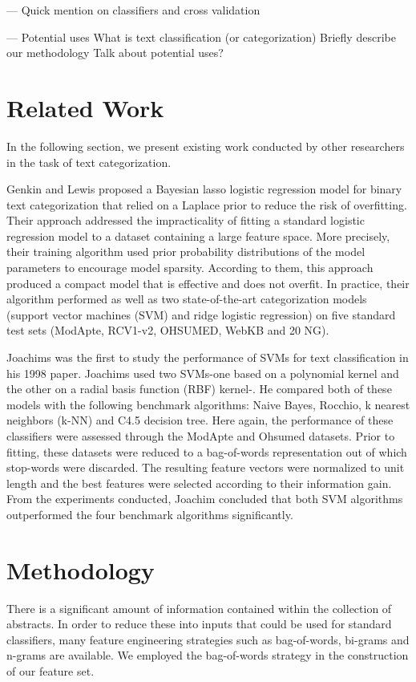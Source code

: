 \documentclass{acm_proc_article-sp}
\begin{document}
--- Quick mention on classifiers and cross validation

--- Potential uses 
What is text classification (or categorization)
Briefly describe our methodology
Talk about potential uses?






\section{Related Work}
In the following section, we present existing work conducted by other researchers in the task of text categorization.

Genkin and Lewis \cite{citeulike:1472197} proposed a Bayesian lasso logistic regression model for binary text categorization that relied on a Laplace prior to reduce the risk of overfitting. Their approach addressed the impracticality of fitting a standard logistic regression model to a dataset containing a large feature space. More precisely, their training algorithm used prior probability distributions of the model parameters to encourage model sparsity. According to them, this approach produced a compact model that is effective and does not overfit. In practice, their algorithm performed as well as two state-of-the-art categorization models (support vector machines (SVM) and ridge logistic regression) on five standard test sets (ModApte, RCV1-v2, OHSUMED, WebKB and 20 NG). 

Joachims \cite{joachims98a} was the first to study the performance of SVMs for text classification in his 1998 paper. Joachims used two SVMs-one based on a polynomial kernel and the other on a radial basis function (RBF) kernel-. He compared both of these models with the following benchmark algorithms: Naive Bayes, Rocchio, k nearest neighbors (k-NN) and C4.5 decision tree. Here again, the performance of these classifiers were assessed through the ModApte and Ohsumed datasets. Prior to fitting, these datasets were reduced to a bag-of-words representation out of which stop-words were discarded. The resulting feature vectors were normalized to unit length and the best features were selected according to their information gain. From the experiments conducted, Joachim concluded that both SVM algorithms outperformed the four benchmark algorithms significantly.


\section{Methodology}
There is a significant amount of information contained within the collection of abstracts. In order to reduce these into inputs that could be used for standard classifiers, many feature engineering strategies such as bag-of-words, bi-grams and n-grams are available. We employed the bag-of-words strategy in the construction of our feature set. 
\end{document}
